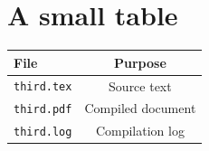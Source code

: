 \documentclass[a4paper,12pt]{article}
\begin{document}
\section{A small table}
\begin{center}
  \begin{tabular}{|l|c|}
    \hline
    File & Purpose \\
    \hline
    \texttt{third.tex} & Source text \\
    \texttt{third.pdf} & Compiled document \\
    \texttt{third.log} & Compilation log \\
    \hline
  \end{tabular}
\end{center}
\end{document}
